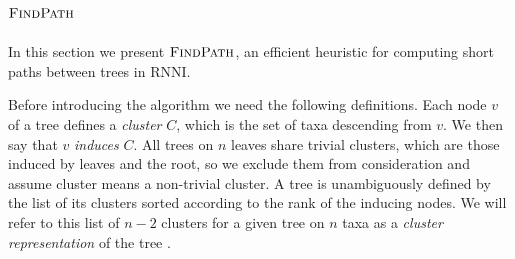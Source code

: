 \documentclass{amsart}
\newcommand{\rnni}{\mathrm{RNNI}}
\newcommand{\findpath}{\textsc{FindPath}}
\begin{document}
\subsection{$\findpath$}
\label{section:alg_findpath}

In this section we present $\findpath$, an efficient heuristic for computing short paths between trees in $\rnni$.

Before introducing the algorithm we need the following definitions.
Each node $v$ of a tree defines a \emph{cluster} $C$, which is the set of taxa descending from $v$.
We then say that $v$ \emph{induces} $C$.
All trees on $n$ leaves share trivial clusters, which are those induced by leaves and the root, so we exclude them from consideration and assume cluster means a non-trivial cluster.
A tree is unambiguously defined by the list of its clusters sorted according to the rank of the inducing nodes.
We will refer to this list of $n-2$ clusters for a given tree on $n$ taxa as a \emph{cluster representation} of the tree \autocite{Gavryushkin2018-ol, Gavryushkin2016-uu, Semple2003-nj}.
\end{document}
